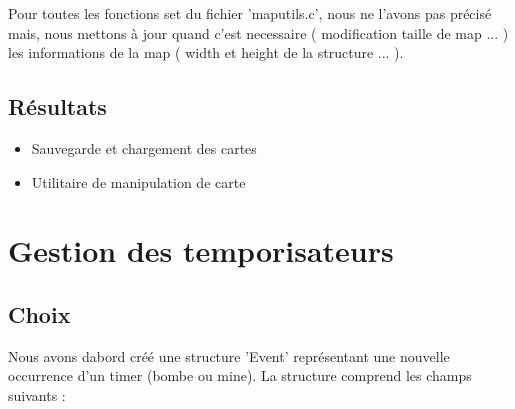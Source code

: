 \documentclass[a4paper]{article}
\newcommand{\cmark}{\ding{51}}%
\newcommand{\xmark}{\ding{55}}%
\newcommand{\done}{\rlap{$\square$}{\raisebox{2pt}{\large\hspace{1pt}\cmark}}%
\hspace{-2.5pt}}
\newcommand{\wontfix}{\rlap{$\square$}{\large\hspace{1pt}\xmark}}
\begin{document}
Pour toutes les fonctions set du fichier 'maputils.c', nous ne l'avons pas précisé mais, nous mettons à jour quand c'est necessaire ( modification taille de map ... ) les informations de la map ( width et height de la structure ... ).

\subsection{Résultats}
\begin{itemize}
  \item Sauvegarde et chargement des cartes
  
  \item Utilitaire de manipulation de carte
\end{itemize}


\section{Gestion des temporisateurs}
\subsection{Choix}
Nous avons dabord créé une structure 'Event' représentant une nouvelle occurrence d'un timer (bombe ou mine). La structure comprend les champs suivants :
\end{document}

